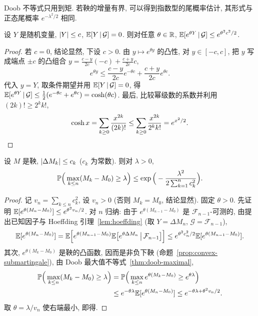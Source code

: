 Doob 不等式只用到矩. 若鞅的增量有界, 可以得到指数型的尾概率估计, 其形式与正态尾概率 $e^{-\lambda^2/2}$ 相同.

\begin{lemma}[Hoeffding 引理]\label{lem:hoeffding}
设 $Y$ 是随机变量, $\abs{Y}\le c$, $\E[Y\,|\,\mathcal{G}]=0$. 则对任意 $\theta\in\R$, $\E[e^{\theta Y}\,|\,\mathcal{G}]\le e^{\theta^2c^2/2}$.
\end{lemma}

\begin{proof}
若 $c=0$, 结论显然, 下设 $c>0$. 由 $y\mapsto e^{\theta y}$ 的凸性, 对 $y\in[-c,c]$, 把 $y$ 写成端点 $\pm c$ 的凸组合 $y=\frac{c-y}{2c}(-c)+\frac{c+y}{2c}c$,
\[
e^{\theta y}\le\frac{c-y}{2c}e^{-\theta c}+\frac{c+y}{2c}e^{\theta c}.
\]
代入 $y=Y$, 取条件期望并用 $\E[Y\,|\,\mathcal{G}]=0$, 得 $\E[e^{\theta Y}\,|\,\mathcal{G}]\le\frac{1}{2}(e^{-\theta c}+e^{\theta c})=\cosh(\theta c)$. 最后, 比较幂级数的系数并利用 $(2k)!\ge2^kk!$,
\[
\cosh x=\sum_{k\ge0}\frac{x^{2k}}{(2k)!}\le\sum_{k\ge0}\frac{x^{2k}}{2^kk!}=e^{x^2/2}.\qedhere
\]
\end{proof}

\begin{theorem}\label{thm:azuma}
设 $M$ 是鞅, $\abs{\Delta M_k}\le c_k$ ($c_k$ 为常数). 则对 $\lambda>0$,
\[
\P\Big(\max_{k\le n}(M_k-M_0)\ge\lambda\Big)\le\exp\Big(-\frac{\lambda^2}{2\sum_{k=1}^nc_k^2}\Big).
\]
\end{theorem}

\begin{proof}
记 $v_n=\sum_{k\le n}c_k^2$, 设 $v_n>0$ (否则 $M_k=M_0$, 结论显然). 固定 $\theta>0$. 先证明 $\E[e^{\theta(M_n-M_0)}]\le e^{\theta^2v_n/2}$. 对 $n$ 归纳: 由于 $e^{\theta(M_{n-1}-M_0)}$ 是 $\mathcal{F}_{n-1}$-可测的, 由提出已知因子与 Hoeffding 引理~\ref{lem:hoeffding} (取 $Y=\Delta M_n$, $\mathcal{G}=\mathcal{F}_{n-1}$),
\[
\E[e^{\theta(M_n-M_0)}]=\E\Big[e^{\theta(M_{n-1}-M_0)}\E\big[e^{\theta\Delta M_n}\,\big|\,\mathcal{F}_{n-1}\big]\Big]\le e^{\theta^2c_n^2/2}\E[e^{\theta(M_{n-1}-M_0)}].
\]
其次, $e^{\theta(M_k-M_0)}$ 是鞅的凸函数, 因而是非负下鞅 (命题~\ref{prop:convex-submartingale}), 由 Doob 最大值不等式~\ref{thm:doob-maximal},
\begin{align*}
\P\Big(\max_{k\le n}(M_k-M_0)\ge\lambda\Big)&=\P\Big(\max_{k\le n}e^{\theta(M_k-M_0)}\ge e^{\theta\lambda}\Big)\\
&\le e^{-\theta\lambda}\E[e^{\theta(M_n-M_0)}]\le e^{-\theta\lambda+\theta^2v_n/2}.
\end{align*}
取 $\theta=\lambda/v_n$ 使右端最小, 即得.
\end{proof}

